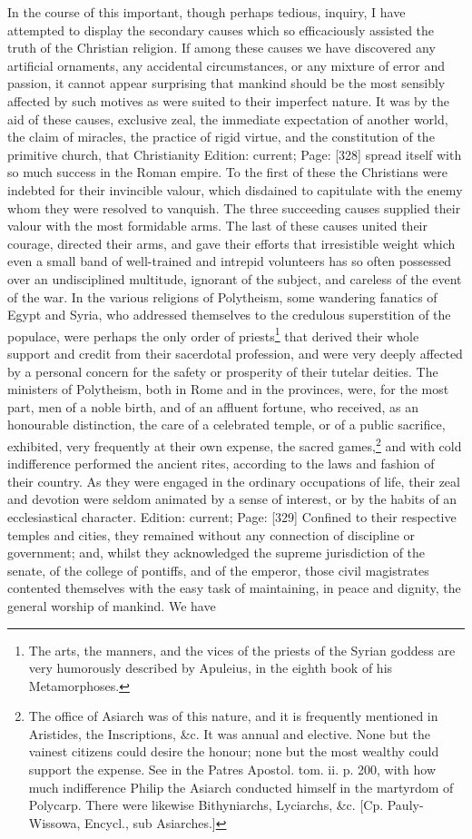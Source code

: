 In the course of this important, though perhaps tedious, inquiry, I have attempted to display the secondary causes which so efficaciously assisted the truth of the Christian religion. If among these causes we have discovered any artificial ornaments, any accidental circumstances, or any mixture of error and passion, it cannot appear surprising that mankind should be the most sensibly affected by such motives as were suited to their imperfect nature. It was by the aid of these causes, exclusive zeal, the immediate expectation of another world, the claim of miracles, the practice of rigid virtue, and the constitution of the primitive church, that Christianity Edition: current; Page: [328] spread itself with so much success in the Roman empire. To the first of these the Christians were indebted for their invincible valour, which disdained to capitulate with the enemy whom they were resolved to vanquish. The three succeeding causes supplied their valour with the most formidable arms. The last of these causes united their courage, directed their arms, and gave their efforts that irresistible weight which even a small band of well-trained and intrepid volunteers has so often possessed over an undisciplined multitude, ignorant of the subject, and careless of the event of the war. In the various religions of Polytheism, some wandering fanatics of Egypt and Syria, who addressed themselves to the credulous superstition of the populace, were perhaps the only order of priests\footnote{The arts, the manners, and the vices of the priests of the Syrian goddess are very humorously described by Apuleius, in the eighth book of his Metamorphoses.} that derived their whole support and credit from their sacerdotal profession, and were very deeply affected by a personal concern for the safety or prosperity of their tutelar deities. The ministers of Polytheism, both in Rome and in the provinces, were, for the most part, men of a noble birth, and of an affluent fortune, who received, as an honourable distinction, the care of a celebrated temple, or of a public sacrifice, exhibited, very frequently at their own expense, the sacred games,\footnote{The office of Asiarch was of this nature, and it is frequently mentioned in Aristides, the Inscriptions, \&c. It was annual and elective. None but the vainest citizens could desire the honour; none but the most wealthy could support the expense. See in the Patres Apostol. tom. ii. p. 200, with how much indifference Philip the Asiarch conducted himself in the martyrdom of Polycarp. There were likewise Bithyniarchs, Lyciarchs, \&c. [Cp. Pauly-Wissowa, Encycl., sub Asiarches.]} and with cold indifference performed the ancient rites, according to the laws and fashion of their country. As they were engaged in the ordinary occupations of life, their zeal and devotion were seldom animated by a sense of interest, or by the habits of an ecclesiastical character. Edition: current; Page: [329] Confined to their respective temples and cities, they remained without any connection of discipline or government; and, whilst they acknowledged the supreme jurisdiction of the senate, of the college of pontiffs, and of the emperor, those civil magistrates contented themselves with the easy task of maintaining, in peace and dignity, the general worship of mankind. We have 